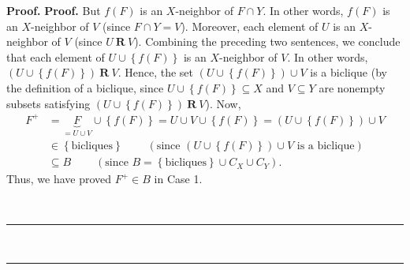 \documentclass[numbers=enddot,12pt,final,onecolumn,notitlepage]{scrartcl}%
\theoremstyle{definition}
\newenvironment{proof}[1][Proof]{\noindent\textbf{#1.} }{\ \rule{0.5em}{0.5em}}
\newenvironment{vershort}{}{}
\begin{document}
\begin{proof}
\begin{proof}
\begin{vershort}
But $f\left(  F\right)  $ is an $X$-neighbor of $F\cap Y$. In other words,
$f\left(  F\right)  $ is an $X$-neighbor of $V$ (since $F\cap Y=V$). Moreover,
each element of $U$ is an $X$-neighbor of $V$ (since $U\ \mathbf{R}\ V$).
Combining the preceding two sentences, we conclude that each element of
$U\cup\left\{  f\left(  F\right)  \right\}  $ is an $X$-neighbor of $V$. In
other words, $\left(  U\cup\left\{  f\left(  F\right)  \right\}  \right)
\ \mathbf{R}\ V$. Hence, the set $\left(  U\cup\left\{  f\left(  F\right)
\right\}  \right)  \cup V$ is a biclique (by the definition of a biclique,
since $U\cup\left\{  f\left(  F\right)  \right\}  \subseteq X$ and $V\subseteq
Y$ are nonempty subsets satisfying $\left(  U\cup\left\{  f\left(  F\right)
\right\}  \right)  \ \mathbf{R}\ V$). Now,
\begin{align*}
F^{+}  &  =\underbrace{F}_{=U\cup V}\cup\left\{  f\left(  F\right)  \right\}
=U\cup V\cup\left\{  f\left(  F\right)  \right\}  =\left(  U\cup\left\{
f\left(  F\right)  \right\}  \right)  \cup V\\
&  \in\left\{  \text{bicliques}\right\}  \ \ \ \ \ \ \ \ \ \ \left(
\text{since }\left(  U\cup\left\{  f\left(  F\right)  \right\}  \right)  \cup
V\text{ is a biclique}\right) \\
&  \subseteq B\ \ \ \ \ \ \ \ \ \ \left(  \text{since }B=\left\{
\text{bicliques}\right\}  \cup C_{X}\cup C_{Y}\right)  .
\end{align*}
Thus, we have proved $F^{+}\in B$ in Case 1.
\end{vershort}


\end{proof}
\end{proof}
\end{document}
